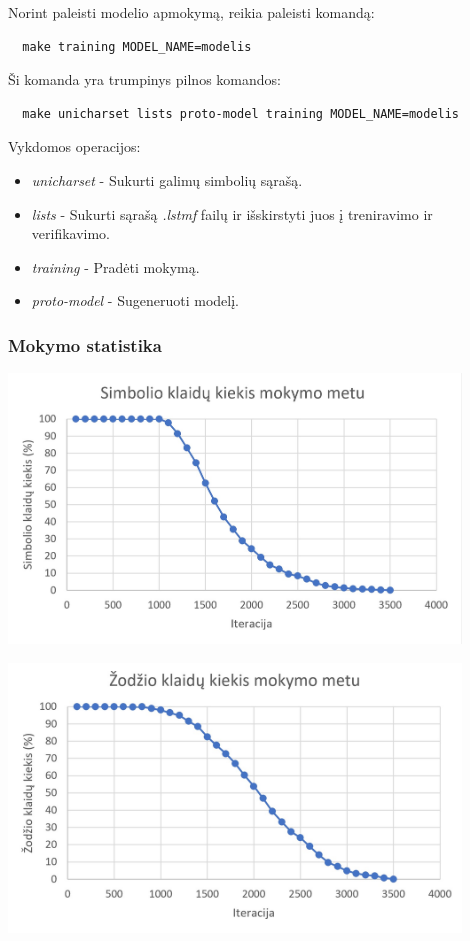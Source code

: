 \documentclass{VUMIFInfBakalaurinis}
\begin{document}
Norint paleisti modelio apmokymą, reikia paleisti komandą: 
\begin{verbatim}
  make training MODEL_NAME=modelis
\end{verbatim}
Ši komanda yra trumpinys pilnos komandos:
\begin{verbatim}
  make unicharset lists proto-model training MODEL_NAME=modelis
\end{verbatim}

Vykdomos operacijos:
\begin{itemize}
  \item \textit{unicharset} - Sukurti galimų simbolių sąrašą.
  \item \textit{lists} - Sukurti sąrašą \textit{.lstmf} failų ir išskirstyti juos į treniravimo ir verifikavimo.
  \item \textit{training} - Pradėti mokymą.
  \item \textit{proto-model} - Sugeneruoti modelį.
\end{itemize}

\subsubsection{Mokymo statistika}

\begin{minipage}{\linewidth}
  \centering
  \includegraphics[width=12cm]{char_stats.jpg}
  \label{borders}
\end{minipage}

\begin{minipage}{\linewidth}
  \centering
  \includegraphics[width=12cm]{word_stats.jpg}
  \label{borders}
\end{minipage}
\end{document}
